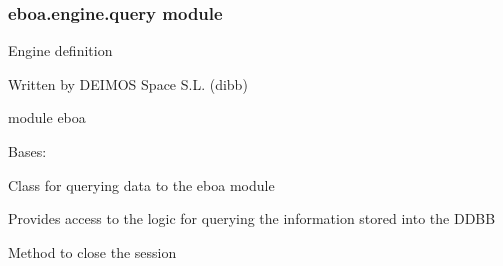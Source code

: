 \subsubsection{eboa.engine.query module}
\label{\detokenize{eboa.engine:module-eboa.engine.query}}\label{\detokenize{eboa.engine:eboa-engine-query-module}}
Engine definition

Written by DEIMOS Space S.L. (dibb)

module eboa

\begin{fulllineitems}
\label{\detokenize{eboa.engine:eboa.engine.query.Query}}
Bases: 

Class for querying data to the eboa module

Provides access to the logic for querying
the information stored into the DDBB

\begin{fulllineitems}
\label{\detokenize{eboa.engine:eboa.engine.query.Query.clear_db}}
\end{fulllineitems}


\begin{fulllineitems}
\label{\detokenize{eboa.engine:eboa.engine.query.Query.close_session}}
Method to close the session

\end{fulllineitems}


\begin{fulllineitems}
\label{\detokenize{eboa.engine:eboa.engine.query.Query.delete}}
\end{fulllineitems}


\end{fulllineitems}
